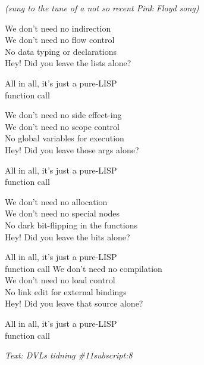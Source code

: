 {\footnotesize\textit{(sung to the tune of a not so recent Pink Floyd song)}}\par
\vspace{10pt}
We don't need no indirection\\
We don't need no flow control\\
No data typing or declarations\\
Hey! Did you leave the lists alone?\par
\vspace{10pt}
All in all, it's just a pure-LISP\\
function call\par
\vspace{10pt}
We don't need no side effect-ing\\
We don't need no scope control\\
No global variables for execution\\
Hey! Did you leave those args alone?\par
\vspace{10pt}
All in all, it's just a pure-LISP\\
function call\par
\vspace{10pt}
We don't need no allocation\\
We don't need no special nodes\\
No dark bit-flipping in the functions\\
Hey! Did you leave the bits alone?\par
\vspace{10pt}
All in all, it's just a pure-LISP\\
function call
\newpage
We don't need no compilation\\
We don't need no load control\\
No link edit for external bindings\\
Hey! Did you leave that source alone?\par
\vspace{10pt}
All in all, it's just a pure-LISP\\
function call\par
\vspace{10pt}
{\footnotesize\textit{Text: DVLs tidning \#11subscript:8}}
